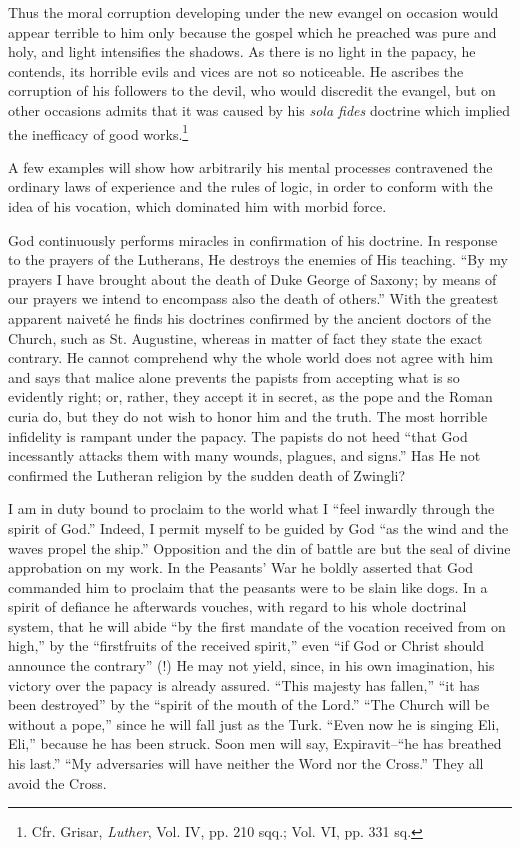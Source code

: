 Thus the moral corruption developing under the new evangel on occasion
would appear terrible to him only because the gospel which he preached was
pure and holy, and light intensifies the shadows. As there is no light in the
papacy, he contends, its horrible evils and vices are not so noticeable. He ascribes
the corruption of his followers to the devil, who would discredit the
evangel, but on other occasions admits that it was caused by his \textit{sola fides}
doctrine which implied the inefficacy of good works.\footnote
{Cfr. Grisar, \textit{Luther}, Vol. IV, pp. 210 sqq.; Vol. VI, pp. 331 sq.}

A few examples will show how arbitrarily his mental processes contravened
the ordinary laws of experience and the rules of logic, in order to
conform with the idea of his vocation, which dominated him with morbid
force.

God continuously performs miracles in confirmation of his doctrine. In
response to the prayers of the Lutherans, He destroys the enemies of His
teaching. “By my prayers I have brought about the death of Duke George
of Saxony; by means of our prayers we intend to encompass also the death of
others.” With the greatest apparent naiveté he finds his doctrines confirmed
by the ancient doctors of the Church, such as St. Augustine, whereas in
matter of fact they state the exact contrary. He cannot comprehend why
the whole world does not agree with him and says that malice alone prevents
the papists from accepting what is so evidently right; or, rather, they
accept it in secret, as the pope and the Roman curia do, but they do not
wish to honor him and the truth. The most horrible infidelity is rampant
under the papacy. The papists do not heed “that God incessantly attacks
them with many wounds, plagues, and signs.” Has He not confirmed the
Lutheran religion by the sudden death of Zwingli?

I am in duty bound to proclaim to the world what I “feel inwardly
through the spirit of God.” Indeed, I permit myself to be guided by God
``as the wind and the waves propel the ship.'' Opposition and the din of
battle are but the seal of divine approbation on my work. In the Peasants’
War he boldly asserted that God commanded him to proclaim that the peasants
were to be slain like dogs. In a spirit of defiance he afterwards vouches,
with regard to his whole doctrinal system, that he will abide “by the first
mandate of the vocation received from on high,” by the “firstfruits of the
received spirit,” even “if God or Christ should announce the contrary” (!)
He may not yield, since, in his own imagination, his victory over the papacy
is already assured. “This majesty has fallen,” “it has been destroyed” by the
``spirit of the mouth of the Lord.'' “The Church will be without a pope,”
since he will fall just as the Turk. “Even now he is singing Eli, Eli,” because
he has been struck. Soon men will say, Expiravit--``he has breathed his
last.” “My adversaries will have neither the Word nor the Cross.” They all
avoid the Cross.


